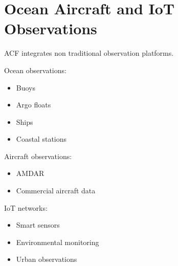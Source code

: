 \section{Ocean Aircraft and IoT Observations}


ACF integrates non traditional observation platforms.



Ocean observations:


\begin{itemize}

\item Buoys

\item Argo floats

\item Ships

\item Coastal stations

\end{itemize}



Aircraft observations:


\begin{itemize}

\item AMDAR

\item Commercial aircraft data

\end{itemize}



IoT networks:


\begin{itemize}

\item Smart sensors

\item Environmental monitoring

\item Urban observations

\end{itemize}
